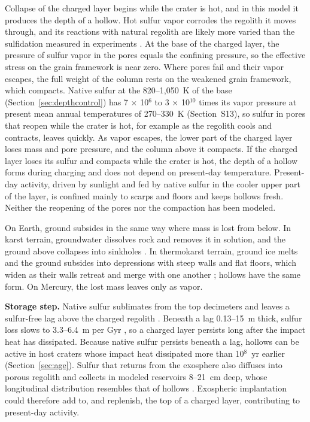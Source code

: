 \documentclass[article,review]{planetary}
\begin{document}
Collapse of the charged layer begins while the crater is hot, and in this model it produces the depth of a hollow. Hot sulfur vapor corrodes the regolith it moves through, and its reactions with natural regolith are likely more varied than the sulfidation measured in experiments \parencite{renggli2022,renggli2023}. At the base of the charged layer, the pressure of sulfur vapor in the pores equals the confining pressure, so the effective stress on the grain framework is near zero. Where pores fail and their vapor escapes, the full weight of the column rests on the weakened grain framework, which compacts. Native sulfur at the 820--1,050~K of the base (Section~\ref{sec:depthcontrol}) has 7 $\times$ 10$^6$ to 3 $\times$ 10$^{10}$ times its vapor pressure at present mean annual temperatures of 270--330~K (Section~S13), so sulfur in pores that reopen while the crater is hot, for example as the regolith cools and contracts, leaves quickly. As vapor escapes, the lower part of the charged layer loses mass and pore pressure, and the column above it compacts. If the charged layer loses its sulfur and compacts while the crater is hot, the depth of a hollow forms during charging and does not depend on present-day temperature. Present-day activity, driven by sunlight and fed by native sulfur in the cooler upper part of the layer, is confined mainly to scarps and floors and keeps hollows fresh. Neither the reopening of the pores nor the compaction has been modeled.

On Earth, ground subsides in the same way where mass is lost from below. In karst terrain, groundwater dissolves rock and removes it in solution, and the ground above collapses into sinkholes \parencite{ford2007}. In thermokarst terrain, ground ice melts and the ground subsides into depressions with steep walls and flat floors, which widen as their walls retreat and merge with one another \parencite{czudek1970}; hollows have the same form. On Mercury, the lost mass leaves only as vapor.

\textbf{Storage step.} Native sulfur sublimates from the top decimeters and leaves a sulfur-free lag above the charged regolith \parencite{blewett2013,blewett2016,thomas2016}. Beneath a lag 0.13--15~m thick, sulfur loss slows to 3.3--6.4~m per Gyr \parencite{phillips2021}, so a charged layer persists long after the impact heat has dissipated. Because native sulfur persists beneath a lag, hollows can be active in host craters whose impact heat dissipated more than 10$^8$~yr earlier (Section~\ref{sec:age}). Sulfur that returns from the exosphere also diffuses into porous regolith and collects in modeled reservoirs 8--21~cm deep, whose longitudinal distribution resembles that of hollows \parencite{verkercke2025}. Exospheric implantation could therefore add to, and replenish, the top of a charged layer, contributing to present-day activity.
\end{document}
